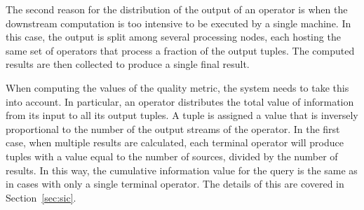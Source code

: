 	The second reason for the distribution of the output of an operator is when the downstream computation
	is too intensive to be executed by a single machine. In this case, the output is split among several
	processing nodes, each hosting the same set of operators that process a fraction of the output
	tuples.
	The computed results are then collected to produce a single final result. 

	When computing the values of the quality metric, the system needs to take this into account. In
	particular, an operator distributes the total value of information from its input to all its output
	tuples.
	A tuple is assigned a value that is inversely proportional to the number of the output streams of the
	operator. In the first case, when multiple results are calculated, each terminal operator will produce
	tuples with a value equal to the number of sources, divided by the number of results. In this way, the
	cumulative information value for the query is the same as in cases with only a single terminal
	operator.
	The details of this are covered in Section~\ref{sec:sic}.
